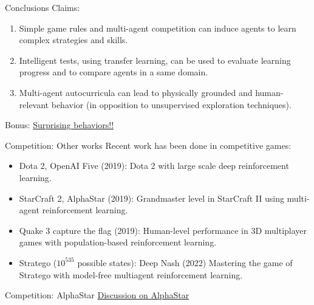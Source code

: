 \documentclass[9pt, hyperref={pdfusetitle,colorlinks=true,allcolors=DarkBlue}]{beamer}
\begin{document}
\begin{frame}{Conclusions}
Claims:
    \begin{enumerate}
        \item Simple game rules and multi-agent competition can induce agents to learn complex strategies and skills.
        \vfill
        \item Intelligent tests, using transfer learning, can be used to evaluate learning progress and to compare agents in a same domain.
        \vfill
        \item Multi-agent autocurricula can lead to physically grounded and human-relevant behavior (in opposition to unsupervised exploration techniques).
    \end{enumerate}{}

Bonus: \href{https://openai.com/research/emergent-tool-use}{Surprising behaviors!!}
\end{frame}{}
    

\begin{frame}{Competition: Other works}
Recent work has been done in competitive games:
 \vfill
\begin{itemize}
    \item Dota 2, OpenAI Five (2019): Dota 2 with large scale deep reinforcement learning.
     \vfill
    \item StarCraft 2, AlphaStar (2019): Grandmaster level in StarCraft II using multi-agent reinforcement learning.
     \vfill
    \item Quake 3 capture the flag (2019): Human-level performance in 3D multiplayer games with population-based reinforcement learning.
     \vfill
     \item Stratego ($10^{535}$ possible states): Deep Nash (2022) Mastering the game of Stratego with model-free multiagent reinforcement learning.

     
\end{itemize}
\end{frame}

\begin{frame}{Competition: AlphaStar}
\href{https://www.deepmind.com/blog/alphastar-mastering-the-real-time-strategy-game-starcraft-ii}{Discussion on AlphaStar}
\end{frame}
\end{document}
